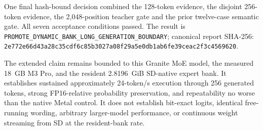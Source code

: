 One final hash-bound decision combined the 128-token evidence, the disjoint
256-token evidence, the 2,048-position teacher gate and the prior twelve-case
semantic gate. All seven acceptance conditions passed. The result is
\texttt{PROMOTE\_DYNAMIC\_BANK\_LONG\_GENERATION\_BOUNDARY}; canonical report
SHA-256:
\texttt{2e772e66d43a28c35cdf6c85b3027a08f29a5e0db1ab6fe39ceac2f3c4569620}.

The extended claim remains bounded to this Granite MoE model, the measured
18~GB M3 Pro, and the resident 2.8196~GiB SD-native expert bank. It establishes
sustained approximately 24-token/s execution through 256 generated tokens,
strong FP16-relative probability preservation, and repeatability no worse than
the native Metal control. It does not establish bit-exact logits, identical
free-running wording, arbitrary larger-model performance, or continuous
weight streaming from SD at the resident-bank rate.
